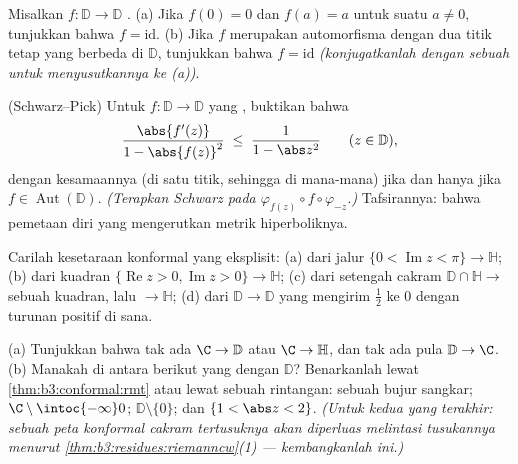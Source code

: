 \begin{exercise}[$\star$]\label{exo:b3:conformal:2}
Misalkan $f \colon \mathbb D \to \mathbb D$ .
(a) Jika $f(0) = 0$ dan $f(a) = a$ untuk suatu $a \neq 0$, tunjukkan bahwa $f
= \mathrm{id}$.
(b) Jika $f$ merupakan automorfisma dengan dua titik tetap yang berbeda
di $\mathbb D$, tunjukkan bahwa $f = \mathrm{id}$
\emph{(konjugatkanlah dengan sebuah  untuk menyusutkannya ke (a))}.
\end{exercise}

\begin{exercise}[$\star\star$]\label{exo:b3:conformal:3}
(Schwarz--Pick) Untuk $f\colon \mathbb D \to
\mathbb D$ yang , buktikan bahwa
\[
\frac{\abs{f'(z)}}{1 - \abs{f(z)}^2} \;\leq\;
\frac{1}{1 - \abs z^2}
\qquad (z \in \mathbb D),
\]
dengan kesamaannya (di satu titik, sehingga di mana-mana) jika dan hanya jika $f \in
\operatorname{Aut}(\mathbb D)$.
\emph{(Terapkan Schwarz pada $\varphi_{f(z)}\circ
f\circ\varphi_{-z}$.)} Tafsirannya: bahwa pemetaan diri yang 
mengerutkan metrik hiperboliknya.
\end{exercise}

\begin{exercise}[$\star\star$]\label{exo:b3:conformal:4}
Carilah kesetaraan konformal yang eksplisit:
(a) dari jalur $\{0 < \operatorname{Im}z < \pi\} \to \mathbb H$;
(b) dari kuadran $\{\operatorname{Re}z > 0,
\operatorname{Im}z > 0\} \to \mathbb H$;
(c) dari setengah cakram $\mathbb D\cap\mathbb H \to$ sebuah kuadran,
lalu $\to \mathbb H$;
(d) dari $\mathbb D \to \mathbb D$ yang mengirim $\frac12$ ke $0$ dengan
turunan positif di sana.
\end{exercise}

\begin{exercise}[$\star\star$]\label{exo:b3:conformal:5}
(a) Tunjukkan bahwa tak ada  $\C \to \mathbb D$ atau $\C \to
\mathbb H$, dan tak ada pula $\mathbb D \to \C$.
(b) Manakah di antara berikut yang  dengan
$\mathbb D$? Benarkanlah lewat \cref{thm:b3:conformal:rmt} atau lewat sebuah
rintangan: sebuah bujur sangkar; $\C\setminus\intoc{-\infty}0$;
$\mathbb D\setminus\{0\}$; dan $\{1 < \abs z < 2\}$.
\emph{(Untuk kedua yang terakhir: sebuah peta konformal cakram
tertusuknya akan diperluas melintasi tusukannya menurut
\cref{thm:b3:residues:riemanncw}(1) --- kembangkanlah ini.)}
\end{exercise}

